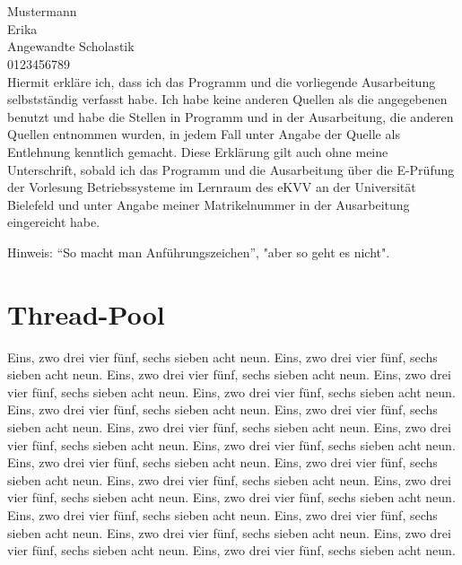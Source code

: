 \documentclass[12pt,a4paper]{article}
\begin{document}
\newcommand{\3}{\ss}

\begin{center}
  \\[1cm]
  \\[3cm]
\end{center}

 Mustermann\\

 Erika\\

 Angewandte Scholastik\\

 0123456789\\[3cm]

\noindent Hiermit erkläre ich, dass ich das Programm und die
vorliegende Ausarbeitung selbstständig verfasst habe. Ich habe keine
anderen Quellen als die angegebenen benutzt und habe die Stellen in
Programm und in der Ausarbeitung, die anderen Quellen entnommen
wurden, in jedem Fall unter Angabe der Quelle als Entlehnung kenntlich
gemacht. Diese Erklärung gilt auch ohne meine Unterschrift, sobald ich
das Programm und die Ausarbeitung über die E-Prüfung der Vorlesung
Betriebssysteme im Lernraum des eKVV an der Universität Bielefeld
und unter Angabe meiner Matrikelnummer in der Ausarbeitung eingereicht
habe.

\thispagestyle{empty}
\newpage
\setcounter{page}{1}

Hinweis: ``So macht man Anführungszeichen'', "aber so geht es nicht".

\section{Thread-Pool}

Eins, zwo drei vier fünf, sechs sieben acht neun.
Eins, zwo drei vier fünf, sechs sieben acht neun.
Eins, zwo drei vier fünf, sechs sieben acht neun.
Eins, zwo drei vier fünf, sechs sieben acht neun.
Eins, zwo drei vier fünf, sechs sieben acht neun.
Eins, zwo drei vier fünf, sechs sieben acht neun.
Eins, zwo drei vier fünf, sechs sieben acht neun.
Eins, zwo drei vier fünf, sechs sieben acht neun.
Eins, zwo drei vier fünf, sechs sieben acht neun.
Eins, zwo drei vier fünf, sechs sieben acht neun.
Eins, zwo drei vier fünf, sechs sieben acht neun.
Eins, zwo drei vier fünf, sechs sieben acht neun.
Eins, zwo drei vier fünf, sechs sieben acht neun.
Eins, zwo drei vier fünf, sechs sieben acht neun.
Eins, zwo drei vier fünf, sechs sieben acht neun.
Eins, zwo drei vier fünf, sechs sieben acht neun.
Eins, zwo drei vier fünf, sechs sieben acht neun.
Eins, zwo drei vier fünf, sechs sieben acht neun.
Eins, zwo drei vier fünf, sechs sieben acht neun.
Eins, zwo drei vier fünf, sechs sieben acht neun.
\end{document}
